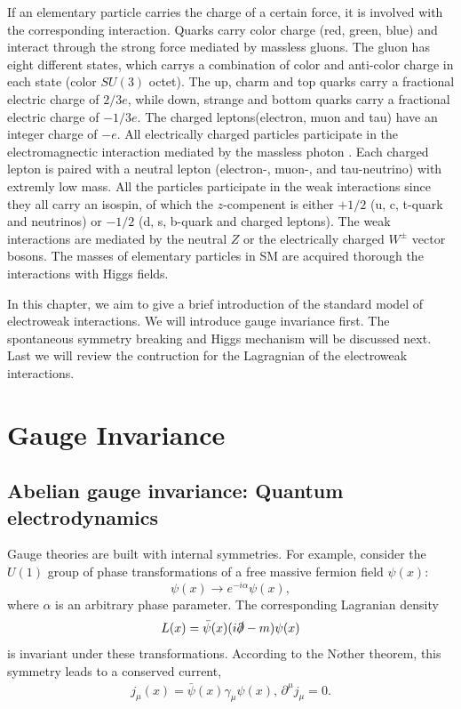 If an elementary particle carries the charge of a certain force, it is involved with the corresponding interaction. Quarks carry color charge (red, green, blue) and interact through the strong force mediated by massless gluons. The gluon has eight different states, which carrys a combination of color and anti-color charge in each state (color $SU(3)$ octet). The up, charm and top quarks carry a fractional electric charge of $2/3e$, while down, strange and bottom quarks carry a fractional electric charge of $-1/3e$. The charged leptons(electron, muon and tau) have an integer charge of $-e$. All electrically charged particles participate in the electromagnectic interaction mediated by the massless photon . Each charged lepton is paired with a neutral lepton (electron-, muon-, and tau-neutrino) with extremly low mass. All the particles participate in the weak interactions since they all carry an isospin, of which the $z$-compenent is either $+1/2$ (u, c, t-quark and neutrinos) or $-1/2$ (d, s, b-quark and charged leptons). The weak interactions are mediated by the neutral $Z$ or the electrically charged $W^{\pm}$ vector bosons. The masses of elementary particles in SM are acquired thorough the interactions with Higgs fields. 

In this chapter, we aim to give a brief introduction of the standard model of electroweak interactions\cite{H.P.PhyRep, BFLWQFT2, CQ}. We will introduce gauge invariance first. The spontaneous symmetry breaking and Higgs mechanism will be discussed next. Last we will review the contruction for the Lagragnian of the electroweak interactions.   


\section{Gauge Invariance}
\subsection{Abelian gauge invariance: Quantum electrodynamics}
Gauge theories are built with internal symmetries. For example, consider the $U(1)$ group of phase transformations of a free massive fermion field $\psi(x)$:
\begin{equation}
\psi(x)\to e^{-i\alpha}\psi(x),
\end{equation}
where $\alpha$ is an arbitrary phase parameter. The corresponding Lagranian density 
\begin{equation}
L(x)=\bar{\psi}(x)(i\slashed{\partial}-m)\psi(x)
\end{equation}
is invariant under these transformations. According to the N$\ddot{o}$ther theorem, this symmetry leads to a conserved current, 
\begin{eqnarray}
j_{\mu}(x)=\bar{\psi}(x)\gamma_\mu\psi(x),\hspace{2pt}
\partial^{\mu}j_\mu = 0.
\end{eqnarray}

